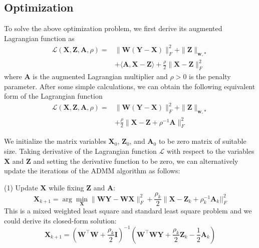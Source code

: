 \documentclass[10pt,twocolumn,letterpaper,sort&compress]{article}
\begin{document}
\subsection{Optimization}

To solve the above optimization problem, we first derive its augmented Lagrangian function as 
\begin{equation}
\begin{split}
\mathcal{L}(\mathbf{X},\mathbf{Z},\mathbf{A},\rho)
=
&\|\mathbf{W}(\mathbf{Y}-\mathbf{X})\|_{F}^{2}
+
\|\mathbf{Z}\|_{\bm{w},*}
\\
&
+
\langle
\mathbf{A},\mathbf{X}-\mathbf{Z}
\rangle
+
\frac{\rho}{2}
\|\mathbf{X}-\mathbf{Z}\|_{F}^{2}
\end{split}
\end{equation}
where $\mathbf{A}$ is the augmented Lagrangian multiplier and $\rho>0$ is the penalty parameter. 
After some simple calculations, we can obtain the following equivalent form of the Lagrangian function
\begin{equation}
\begin{split}
\mathcal{L}(\mathbf{X},\mathbf{Z},\mathbf{A},\rho)
=
&
\|\mathbf{W}(\mathbf{Y}-\mathbf{X})\|_{F}^{2}
+
\|\mathbf{Z}\|_{\bm{w},*}
\\
&
+
\frac{\rho}{2}
\|\mathbf{X}-\mathbf{Z}+\rho^{-1}\mathbf{A}\|_{F}^{2}
\end{split}
\end{equation}

We initialize the matrix variables $\mathbf{X}_{0}$, $\mathbf{Z}_{0}$, and $\mathbf{A}_{0}$ to be zero matrix of suitable size.
Taking derivative of the Lagrangian function $\mathcal{L}$ with respect to the variables $\mathbf{X}$ and $\mathbf{Z}$ and setting the derivative function to be zero, we can alternatively update the iterations of the ADMM algorithm as follows:

(1) Update $\mathbf{X}$ while fixing $\mathbf{Z}$ and $\mathbf{A}$:
\begin{equation}
\mathbf{X}_{k+1}
=
\arg\min_{\mathbf{X}}
\|\mathbf{W}\mathbf{Y} - \mathbf{W}\mathbf{X}\|_{F}^{2} 
+
\frac{\rho_{k}}{2}\|\mathbf{X} - \mathbf{Z}_{k} + \rho_{k}^{-1}\mathbf{A}_{k}||_{F}^{2}
\end{equation}
This is a mixed weighted least square and standard least square problem and we could derive its closed-form solution:
\begin{equation}
\mathbf{X}_{k+1}
=
(\mathbf{W}^{\top}\mathbf{W}+\frac{\rho_{k}}{2}\mathbf{I})^{-1}
(\mathbf{W}^{\top}\mathbf{W}\mathbf{Y} + \frac{\rho_{k}}{2}\mathbf{Z}_{k} -\frac{1}{2}\mathbf{A}_{k})
\end{equation}
\end{document}
